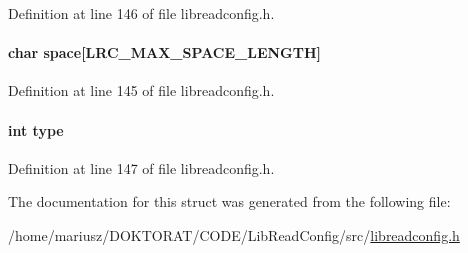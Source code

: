 Definition at line 146 of file libreadconfig.h.\hypertarget{struct_l_r_c__config_types_4754d9e0429a1914e3617de872b4a736}{
\paragraph[{space}]{\setlength{\rightskip}{0pt plus 5cm}char {\bf space}\mbox{[}LRC\_\-MAX\_\-SPACE\_\-LENGTH\mbox{]}}\hfill}
\label{struct_l_r_c__config_types_4754d9e0429a1914e3617de872b4a736}




Definition at line 145 of file libreadconfig.h.\hypertarget{struct_l_r_c__config_types_c765329451135abec74c45e1897abf26}{
\paragraph[{type}]{\setlength{\rightskip}{0pt plus 5cm}int {\bf type}}\hfill}
\label{struct_l_r_c__config_types_c765329451135abec74c45e1897abf26}




Definition at line 147 of file libreadconfig.h.

The documentation for this struct was generated from the following file:\begin{CompactItemize}
\item 
/home/mariusz/DOKTORAT/CODE/LibReadConfig/src/\hyperlink{libreadconfig_8h}{libreadconfig.h}\end{CompactItemize}
